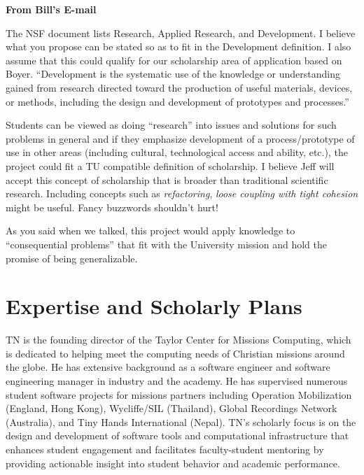 \documentclass{article}
\begin{document}
\begin{framed}
  \textbf{From Bill's E-mail}

  The NSF document lists Research, Applied Research, and Development.
  I believe what you propose can be stated so as to fit in the Development definition.
  I also assume that this could qualify for our scholarship area of application based on Boyer.
  ``Development is the systematic use of the knowledge or understanding
  gained from research
  directed toward the production of useful materials, devices, or methods,
  including the design and development of prototypes and processes.''

  Students can be viewed as doing ``research'' into issues and solutions
  for such problems in general and
  if they emphasize development of a process/prototype of use in other areas
  (including cultural, technological access and ability, etc.),
  the project could fit a TU compatible definition of scholarship.
  I believe Jeff will accept this concept of scholarship
  that is broader than traditional scientific research.
  Including concepts such as \emph{refactoring}, \emph{loose coupling with tight cohesion} might be useful.
  Fancy buzzwords shouldn't hurt!

  As you said when we talked, this project would apply knowledge to ``consequential
  problems'' that fit with the University mission and hold the promise of being
  generalizable.
\end{framed}


\section{Expertise and Scholarly Plans}
\label{sec:expertise-plans}


TN is the founding director of the
Taylor Center for Missions Computing,
which is dedicated to helping meet the computing needs
of Christian missions around the globe.
He has extensive background as a software engineer
and software engineering manager
in industry and the academy.
He has supervised numerous student software projects
for missions partners including
Operation Mobilization (England, Hong Kong),
Wycliffe/SIL (Thailand),
Global Recordings Network (Australia),
and
Tiny Hands International (Nepal).
TN's scholarly focus is on the design and development
of software tools and computational infrastructure
that enhances student engagement
and facilitates faculty-student mentoring
by providing actionable insight
into student behavior and academic performance.
\end{document}
